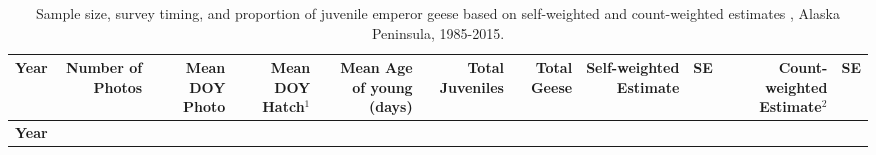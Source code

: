 \documentclass[]{article}
\begin{document}
\setlength{\parindent}{0in} \setlength{\leftskip}{0in}
\setlength{\parskip}{0pt} \noindent
\newpage

\begin{longtable}[]{@{}rrrrrrrrrrr@{}}
\caption{Sample size, survey timing, and proportion of juvenile emperor
geese based on self-weighted and count-weighted estimates , Alaska
Peninsula, 1985-2015.}\tabularnewline
\toprule
\begin{minipage}[b]{0.06\columnwidth}\raggedleft\strut
\textbf{Year}\strut
\end{minipage} & \begin{minipage}[b]{0.07\columnwidth}\raggedleft\strut
\textbf{Number of Photos}\strut
\end{minipage} & \begin{minipage}[b]{0.07\columnwidth}\raggedleft\strut
\textbf{Mean DOY Photo}\strut
\end{minipage} & \begin{minipage}[b]{0.07\columnwidth}\raggedleft\strut
\textbf{Mean DOY Hatch$^1$}\strut
\end{minipage} & \begin{minipage}[b]{0.07\columnwidth}\raggedleft\strut
\textbf{Mean Age of young (days)}\strut
\end{minipage} & \begin{minipage}[b]{0.07\columnwidth}\raggedleft\strut
\textbf{Total Juveniles}\strut
\end{minipage} & \begin{minipage}[b]{0.05\columnwidth}\raggedleft\strut
\textbf{Total Geese}\strut
\end{minipage} & \begin{minipage}[b]{0.09\columnwidth}\raggedleft\strut
\textbf{Self-weighted Estimate}\strut
\end{minipage} & \begin{minipage}[b]{0.05\columnwidth}\raggedleft\strut
\textbf{SE}\strut
\end{minipage} & \begin{minipage}[b]{0.10\columnwidth}\raggedleft\strut
\textbf{Count-weighted Estimate$^2$}\strut
\end{minipage} & \begin{minipage}[b]{0.04\columnwidth}\raggedleft\strut
\textbf{SE}\strut
\end{minipage}\tabularnewline
\midrule
\endfirsthead
\toprule
\begin{minipage}[b]{0.06\columnwidth}\raggedleft\strut
\textbf{Year}\strut
\end{minipage} & \begin{minipage}[b]{0.07\columnwidth}\raggedleft\strut

\end{minipage}
\end{longtable}
\end{document}
